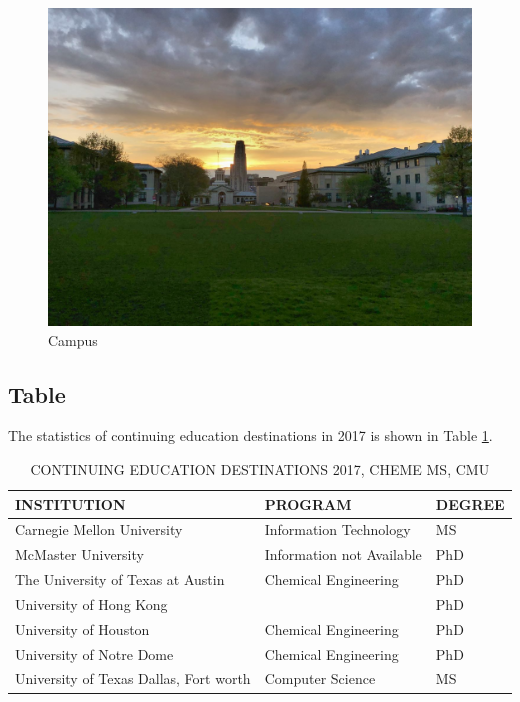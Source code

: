\documentclass[12pt]{article}
\begin{document}
\begin{figure}[!h]
    \centering
    \includegraphics[scale = 0.2]{campus}
    \caption{Campus}
    \label{fig:campus}
\end{figure}

\subsection{Table}

The statistics of continuing education destinations in 2017 is shown in Table \ref{tab:education}.

\begin{table}[htbp]
  \centering
  \caption{CONTINUING EDUCATION DESTINATIONS 2017, CHEME MS, CMU}
    \begin{tabular}{lll}
    \toprule
    INSTITUTION & PROGRAM & DEGREE \\
    \midrule
    Carnegie Mellon University & Information Technology & MS \\
    McMaster University & Information not Available & PhD \\
    The University of Texas at Austin & Chemical Engineering & PhD \\
    University of Hong Kong &       & PhD \\
    University of Houston & Chemical Engineering & PhD \\
    University of Notre Dome & Chemical Engineering & PhD \\
    University of Texas Dallas, Fort worth & Computer Science & MS \\
    \bottomrule
    \end{tabular}%
  \label{tab:education}%
\end{table}%



\clearpage



\end{document}

